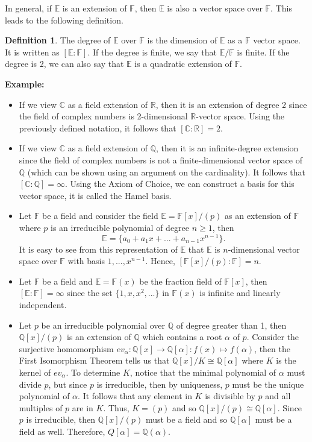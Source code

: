 \documentclass{article}
\theoremstyle{plain}
\theoremstyle{definition}
\newtheorem*{definition}{Definition}
\newcommand{\C}{\mathbb{C}}
\newcommand{\R}{\mathbb{R}}
\newcommand{\Q}{\mathbb{Q}}
\newcommand{\F}{\mathbb{F}}
\newcommand{\E}{\mathbb{E}}
\newcommand{\isomorphic}{\cong}
\newenvironment{example}{\noindent\textbf{Example:} \vspace{-0.2cm}\begin{itemize}}{\end{itemize}}
\begin{document}
In general, if $\E$ is an extension of $\F$, then $\E$ is also a vector space over $\F$. This leads to the following definition.

\begin{definition}
    The degree of $\E$ over $\F$ is the dimension of $\E$ as a $\F$ vector space. It is written as $[\E:\F]$. If the degree is finite, we say that $\E/\F$ is finite. If the degree is 2, we can also say that $\E$ is a quadratic extension of $\F$.
\end{definition}

\begin{example}
    \item If we view $\C$ as a field extension of $\R$, then it is an extension of degree 2 since the field of complex numbers is 2-dimensional $\R$-vector space. Using the previously defined notation, it follows that $[\C : \R] = 2$.
    \item If we view $\C$ as a field extension of $\Q$, then it is an infinite-degree extension since the field of complex numbers is not a finite-dimensional vector space of $\Q$ (which can be shown using an argument on the cardinality). It follows that $[\C : \Q] = \infty$. Using the Axiom of Choice, we can construct a basis for this vector space, it is called the Hamel basis.
    \item Let $\F$ be a field and consider the field $\E = \F[x]/(p)$ as an extension of $\F$ where $p$ is an irreducible polynomial of degree $n \geq 1$, then 
    $$\E = \{a_0 + a_1x + ... + a_{n-1}x^{n-1}\}.$$
    It is easy to see from this representation of $\E$ that $\E$ is $n$-dimensional vector space over $\F$ with basis $1, ..., x^{n-1}$. Hence,  $[\F[x]/(p) : \F] = n$.
    \item Let $\F$ be a field and $\E = \F(x)$ be the fraction field of $\F[x]$, then $[\E : \F] = \infty$ since the set $\{1, x, x^2, ...\}$ in $\F(x)$ is infinite and linearly independent.
    \item Let $p$ be an irreducible polynomial over $\Q$ of degree greater than 1, then $\Q[x]/(p)$ is an extension of $\Q$ which contains a root $\alpha$ of $p$. Consider the surjective homomorphism $ev_{\alpha} : \Q[x] \to \Q[\alpha] : f(x) \mapsto f(\alpha)$, then the First Isomorphism Theorem tells us that $\Q[x]/K \isomorphic \Q[\alpha]$ where $K$ is the kernel of $ev_{\alpha}$. To determine $K$, notice that the minimal polynomial of $\alpha$ must divide $p$, but since $p$ is irreducible, then by uniqueness, $p$ must be the unique polynomial of $\alpha$. It follows that any element in $K$ is divisible by $p$ and all multiples of $p$ are in $K$. Thus, $K = (p)$ and so $\Q[x]/(p) \isomorphic \Q[\alpha]$. Since $p$ is irreducible, then $\Q[x]/(p)$ must be a field and so $\Q[\alpha]$ must be a field as well. Therefore, $Q[\alpha] = \Q(\alpha)$. 
\end{example}
\end{document}
